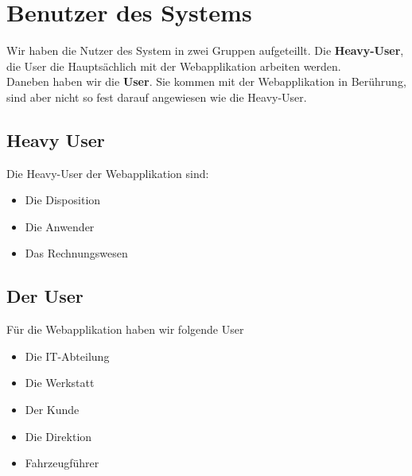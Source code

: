\section{Benutzer des Systems}
Wir haben die Nutzer des System in zwei Gruppen aufgeteillt. Die \textbf{Heavy-User}, die User die Hauptsächlich mit der Webapplikation arbeiten werden.\\
Daneben haben wir die \textbf{User}. Sie kommen mit der Webapplikation in Berührung, sind aber nicht so fest darauf angewiesen wie die Heavy-User.
%
\subsection{Heavy User}
Die Heavy-User der Webapplikation sind:
\begin{itemize}
\item Die Disposition
\item Die Anwender
\item Das Rechnungswesen
\end{itemize}
%
\subsection{Der User}
Für die Webapplikation haben wir folgende User
\begin{itemize}
\item Die IT-Abteilung
\item Die Werkstatt
\item Der Kunde
\item Die Direktion
\item Fahrzeugführer
\end{itemize}